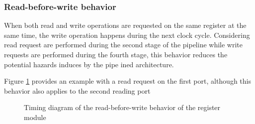 \subsubsection{Read-before-write behavior}

\begin{content}
    When both read and write operations are requested on the same register at the same time, the write operation happens during the next clock cycle. Considering read request
 are performed during the second stage of the pipeline while write requests are performed during the fourth stage, this behavior reduces the potential hazards induces by the pipe
ined architecture.

    Figure \ref{fig:regm-behavior-read-before-write} provides an example with a read request on the first port, although this behavior also applies to the second reading port

\end{content}

\begin{figure}[H]
    \centering
    
    \caption{Timing diagram of the read-before-write behavior of the register module}
    \label{fig:regm-behavior-read-before-write}
\end{figure}

\newpage
